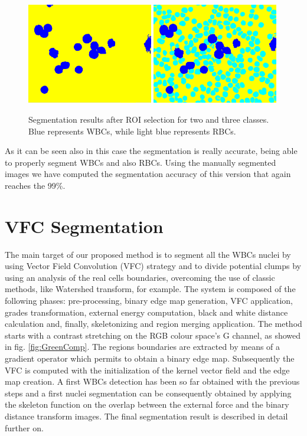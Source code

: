 \documentclass[final,a4paper,12pt,english]{UnicaPhdThesis3}
\begin{document}
\begin{figure}[!t]
	\centering
	\includegraphics[width=0.49\textwidth]{images/2015_1_caip/ROI4}
	\includegraphics[width=0.49\textwidth]{images/2015_1_caip/ROI5}
	\caption{\label{fig:ex7}Segmentation results after ROI selection for two and three classes. Blue represents WBCs, while light blue represents RBCs.}
\end{figure}

As it can be seen also in this case the segmentation is really accurate, being able to properly segment WBCs and also RBCs. Using the manually segmented images we have computed the segmentation accuracy of this version that again reaches the 99\%. 

\section{VFC Segmentation} %
The main target of our proposed method is to segment all the WBCs nuclei by using Vector Field Convolution (VFC) strategy and to divide potential clumps by using an analysis of the real cells boundaries, overcoming the use of classic methods, like Watershed transform, for example. 
The system is composed of the following phases: pre-processing, binary edge map generation, VFC \cite{Bing} application, grades transformation, external energy computation, black and white distance calculation and, finally, skeletonizing and region merging application. The method starts with a contrast stretching on the RGB colour space's G channel, as showed in fig. \ref{fig:GreenComp}. 
The regions boundaries are extracted by means of a gradient operator which permits to obtain a binary edge map. Subsequently the VFC is computed with the initialization of the kernel vector field and the edge map creation. A first WBCs detection has been so far obtained with the previous steps and a first nuclei segmentation can be consequently obtained by applying the skeleton function on the overlap between the external force and the binary distance transform images. The final segmentation result is described in detail further on.
\end{document}
